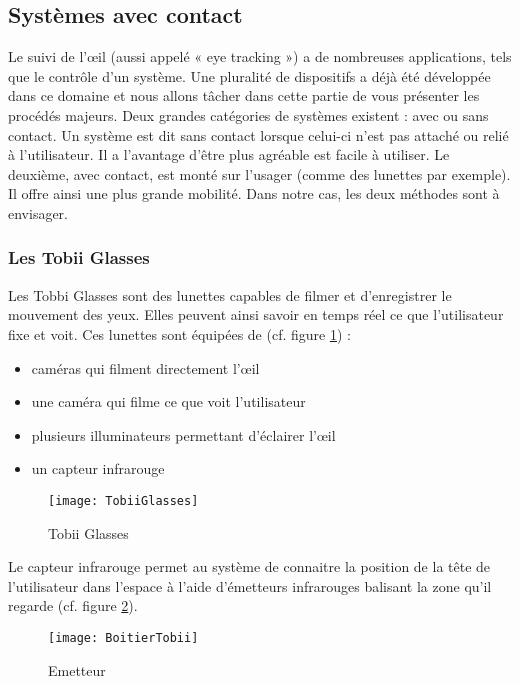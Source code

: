 \subsection{Systèmes avec contact}

Le suivi de l’œil (aussi appelé « eye tracking ») a de nombreuses applications, tels que le contrôle d’un système. Une pluralité de dispositifs a déjà été développée dans ce domaine et nous allons tâcher dans cette partie de vous présenter les procédés majeurs. Deux grandes catégories de systèmes existent : avec ou sans contact. Un système est dit sans contact lorsque celui-ci n’est pas attaché ou relié à l’utilisateur. Il a l’avantage d’être plus agréable est facile à utiliser. Le deuxième, avec contact, est monté sur l’usager (comme des lunettes par exemple). Il offre ainsi une plus grande mobilité. Dans notre cas, les deux méthodes sont à envisager.

\subsubsection{Les Tobii Glasses}

Les Tobbi Glasses \cite{tobiiglasses} sont des lunettes capables de filmer et d’enregistrer le mouvement des yeux. Elles peuvent ainsi savoir en temps réel ce que l’utilisateur fixe et voit.
Ces lunettes sont équipées de (cf. figure \ref{fig:TG}) : 
\begin{itemize}[label=\textbullet,font=\color{black}]
\item caméras qui filment directement l’œil
\item une caméra qui filme ce que voit l’utilisateur
\item plusieurs illuminateurs permettant d’éclairer l’œil
\item un capteur infrarouge
\end{itemize}

\begin{figure}[h]
  \centering
  \texttt{[image: TobiiGlasses]}
  \caption{Tobii Glasses}
  \label{fig:TG}
\end{figure}

Le capteur infrarouge permet au système de connaitre la position de la tête de l’utilisateur dans l’espace à l’aide d’émetteurs infrarouges balisant la zone qu'il regarde (cf. figure \ref{fig:Emetteur}).

\begin{figure}[H]
  \centering
  \texttt{[image: BoitierTobii]}
  \caption{Emetteur}
  \label{fig:Emetteur}
\end{figure}

